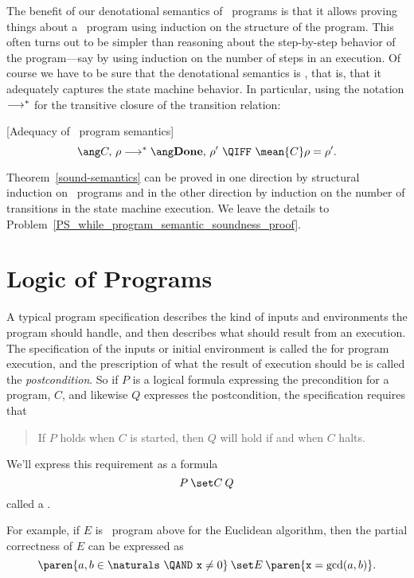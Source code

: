 The benefit of our denotational semantics of \while\ programs is that it allows
proving things about a \while\ program using induction on the structure of the
program.  This often turns out to be simpler than reasoning about the
step-by-step behavior of the program---say by using induction on the number of
steps in an execution.  Of course we have to be sure that the denotational
semantics is , that is, that it adequately captures the state
machine behavior.  In particular, using the notation $\mathrel{\longrightarrow}^*$ for the
transitive closure of the transition relation:

\begin{theorem}\label{sound-semantics}[Adequacy of \while\ program semantics]
\[
\haltswith{C}{\rho}{\rho'}\ \QIFF\ \mean{C}\rho = \rho'.
\]
\end{theorem}
Theorem~\ref{sound-semantics} can be proved in one direction by structural
induction on \while\ programs and in the other direction by induction on the
number of transitions in the state machine execution.  We leave the details to
Problem~\ref{PS_while_program_semantic_soundness_proof}.

\begin{problems}
\homeworkproblems
{}
\end{problems}

\section{Logic of Programs}

A typical program specification describes the kind of inputs and
environments the program should handle, and then describes what should
result from an execution.  The specification of the inputs or initial
environment is called the  for program execution, and
the prescription of what the result of execution should be is called the
\emph{postcondition}.  So if $P$ is a logical formula expressing the precondition
for a program, $C$, and likewise $Q$ expresses the postcondition, the
specification requires that
\begin{quote}
If $P$ holds when $C$ is started, then $Q$ will hold if and when $C$ halts.
\end{quote}
We'll express this requirement as a formula
\[
\after{P}{C}{Q}
\]
called a .

For example, if $E$ is \while\ program above for the Euclidean
algorithm, then the partial correctness of $E$ can be expressed as
\begin{equation}\label{eucpc}
\after{\paren{a, b \in \naturals\ \QAND\  \mathtt{x} \neq 0}}{E}
                   {\paren{\mathtt{x} = \gcd(a,b)}}.
\end{equation}

